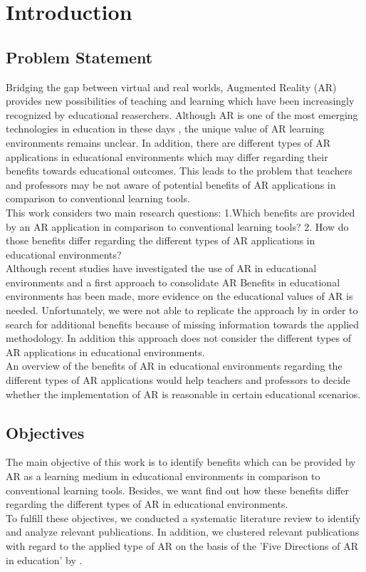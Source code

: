 \section{Introduction}
\subsection{Problem Statement}
Bridging the gap between virtual and real worlds, Augmented Reality (AR) provides new possibilities of teaching and learning which have been increasingly recognized by educational reaserchers. \autocite [cf.][41]{Wu.2013} Although AR is one of the most emerging technologies in education in these days \autocite [cf.][]{Johnson.2010}, the unique value of AR learning environments remains unclear. \autocite [cf.][48]{Wu.2013} In addition, there are different types of AR applications in educational environments which may differ regarding their benefits towards educational outcomes. \autocite [cf.][127-130]{Yuen.2011} This leads to the problem that teachers and professors may be not aware of potential benefits of AR applications in comparison to conventional learning tools. \\
This work considers two main research questions: 1.Which benefits are provided by an AR application in comparison to conventional learning tools? 2. How do those benefits differ regarding the different types of AR applications in educational environments? \\
Although recent studies have investigated the use of AR in educational environments \autocite {Wu.2013}\mulcit\autocite {Lee.2012} and a first approach to consolidate AR Benefits in educational environments has been made, \autocite [cf.][]{Radu.2014} more evidence on the educational values of AR is needed. Unfortunately, we were not able to replicate the approach by \cite{Radu.2014} in order to search for additional benefits because of missing information towards the applied methodology. In addition this approach does not consider the different types of AR applications in educational environments.\\
An overview of the benefits of AR in educational environments regarding the different types of AR applications would help teachers and professors to decide whether the implementation of AR is reasonable in certain educational scenarios.\\
\subsection{Objectives}
The main objective of this work is to identify benefits which can be provided by AR as a learning medium in educational environments in comparison to conventional learning tools. Besides, we want find out how these benefits differ regarding the different types of AR in educational environments. \\
To fulfill these objectives, we conducted a systematic literature review to identify and analyze relevant publications. In addition, we clustered relevant publications with regard to the applied type of AR on the basis of the 'Five Directions of AR in education' by \cite{Yuen.2011}.
